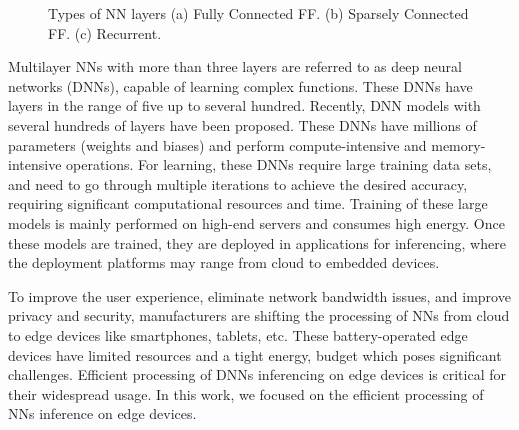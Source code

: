 \documentclass[a4paper,10pt]{article}
\begin{document}
\begin{figure}[!htb]
	\centering
    \captionsetup{font=sf}
	\hfil
	\hfil
	\caption{Types of NN layers (a) Fully Connected FF. (b) Sparsely Connected FF. (c) Recurrent. }
	\label{fig:nnLayers}
\end{figure}

Multilayer NNs with more than three layers are referred to as deep neural networks (DNNs), capable of learning complex functions. These DNNs have layers in the range of five up to several hundred. Recently, DNN models with several hundreds of layers have been proposed. These DNNs have millions of parameters (weights and biases) and perform compute-intensive and memory-intensive operations. For learning, these DNNs require large training data sets, and need to go through multiple iterations to achieve the desired accuracy, requiring significant computational resources and time. Training of these large models is mainly performed on high-end servers and consumes high energy. Once these models are trained, they are deployed in applications for inferencing, where the deployment platforms may range from cloud to embedded devices.

To improve the user experience, eliminate network bandwidth issues, and improve privacy and security, manufacturers are shifting the processing of NNs from cloud to edge devices like smartphones, tablets, etc. These battery-operated edge devices have limited resources and a tight energy, budget which poses significant challenges. Efficient processing of DNNs inferencing on edge devices is critical for their widespread usage. In this work, we focused on the efficient processing of NNs inference on edge devices. 
\end{document}
